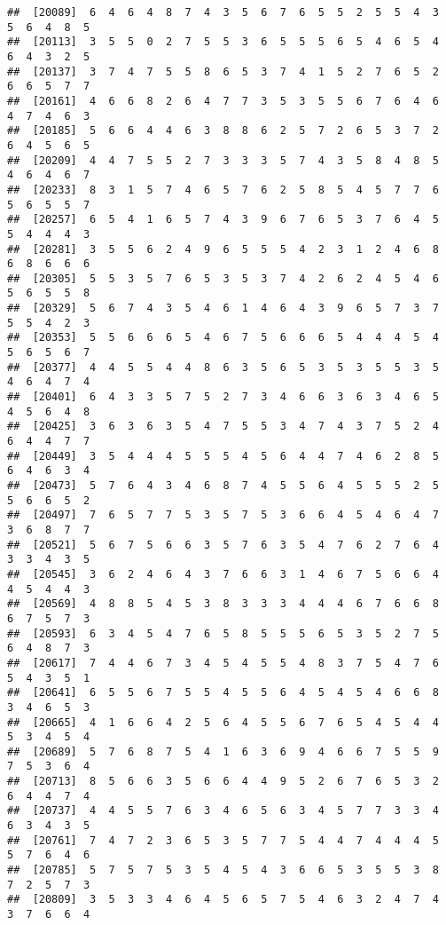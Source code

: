 \documentclass[
]{book}
\begin{document}
\begin{verbatim}
##  [20089]  6  4  6  4  8  7  4  3  5  6  7  6  5  5  2  5  5  4  3  5  6  4  8  5
##  [20113]  3  5  5  0  2  7  5  5  3  6  5  5  5  6  5  4  6  5  4  6  4  3  2  5
##  [20137]  3  7  4  7  5  5  8  6  5  3  7  4  1  5  2  7  6  5  2  6  6  5  7  7
##  [20161]  4  6  6  8  2  6  4  7  7  3  5  3  5  5  6  7  6  4  6  4  7  4  6  3
##  [20185]  5  6  6  4  4  6  3  8  8  6  2  5  7  2  6  5  3  7  2  6  4  5  6  5
##  [20209]  4  4  7  5  5  2  7  3  3  3  5  7  4  3  5  8  4  8  5  4  6  4  6  7
##  [20233]  8  3  1  5  7  4  6  5  7  6  2  5  8  5  4  5  7  7  6  5  6  5  5  7
##  [20257]  6  5  4  1  6  5  7  4  3  9  6  7  6  5  3  7  6  4  5  5  4  4  4  3
##  [20281]  3  5  5  6  2  4  9  6  5  5  5  4  2  3  1  2  4  6  8  6  8  6  6  6
##  [20305]  5  5  3  5  7  6  5  3  5  3  7  4  2  6  2  4  5  4  6  5  6  5  5  8
##  [20329]  5  6  7  4  3  5  4  6  1  4  6  4  3  9  6  5  7  3  7  5  5  4  2  3
##  [20353]  5  5  6  6  6  5  4  6  7  5  6  6  6  5  4  4  4  5  4  5  6  5  6  7
##  [20377]  4  4  5  5  4  4  8  6  3  5  6  5  3  5  3  5  5  3  5  4  6  4  7  4
##  [20401]  6  4  3  3  5  7  5  2  7  3  4  6  6  3  6  3  4  6  5  4  5  6  4  8
##  [20425]  3  6  3  6  3  5  4  7  5  5  3  4  7  4  3  7  5  2  4  6  4  4  7  7
##  [20449]  3  5  4  4  4  5  5  5  4  5  6  4  4  7  4  6  2  8  5  6  4  6  3  4
##  [20473]  5  7  6  4  3  4  6  8  7  4  5  5  6  4  5  5  5  2  5  5  6  6  5  2
##  [20497]  7  6  5  7  7  5  3  5  7  5  3  6  6  4  5  4  6  4  7  3  6  8  7  7
##  [20521]  5  6  7  5  6  6  3  5  7  6  3  5  4  7  6  2  7  6  4  3  3  4  3  5
##  [20545]  3  6  2  4  6  4  3  7  6  6  3  1  4  6  7  5  6  6  4  4  5  4  4  3
##  [20569]  4  8  8  5  4  5  3  8  3  3  3  4  4  4  6  7  6  6  8  6  7  5  7  3
##  [20593]  6  3  4  5  4  7  6  5  8  5  5  5  6  5  3  5  2  7  5  6  4  8  7  3
##  [20617]  7  4  4  6  7  3  4  5  4  5  5  4  8  3  7  5  4  7  6  5  4  3  5  1
##  [20641]  6  5  5  6  7  5  5  4  5  5  6  4  5  4  5  4  6  6  8  3  4  6  5  3
##  [20665]  4  1  6  6  4  2  5  6  4  5  5  6  7  6  5  4  5  4  4  5  3  4  5  4
##  [20689]  5  7  6  8  7  5  4  1  6  3  6  9  4  6  6  7  5  5  9  7  5  3  6  4
##  [20713]  8  5  6  6  3  5  6  6  4  4  9  5  2  6  7  6  5  3  2  6  4  4  7  4
##  [20737]  4  4  5  5  7  6  3  4  6  5  6  3  4  5  7  7  3  3  4  6  3  4  3  5
##  [20761]  7  4  7  2  3  6  5  3  5  7  7  5  4  4  7  4  4  4  5  5  7  6  4  6
##  [20785]  5  7  5  7  5  3  5  4  5  4  3  6  6  5  3  5  5  3  8  7  2  5  7  3
##  [20809]  3  5  3  3  4  6  4  5  6  5  7  5  4  6  3  2  4  7  4  3  7  6  6  4

\end{verbatim}
\end{document}

